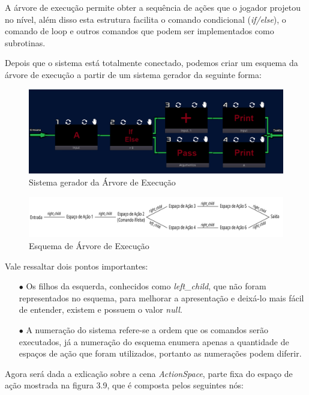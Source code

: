 A árvore de execução permite obter a sequência de ações que o jogador projetou
no nível, além disso esta estrutura facilita o comando condicional 
(\textit{if/else}), o comando de loop e outros comandos que podem ser 
implementados como subrotinas.

Depois que o sistema está totalmente conectado, podemos criar um esquema da
árvore de execução a partir de um sistema gerador da seguinte forma:

\begin{figure}[H]
    \includegraphics[width=\textwidth]{../figuras/sistema_conectado_arvore_execucao.png}
    \caption{Sistema gerador da Árvore de Execução}
\end{figure}

\begin{figure}[H]
    \includegraphics[width=\textwidth]{../figuras/arvore_execucao_redim.png}
    \caption{Esquema de Árvore de Execução}
\end{figure}

Vale ressaltar dois pontos importantes:

\begin{itemize}
    \item[$\bullet$]
        Os filhos da esquerda, conhecidos como \textit{left\_child}, que 
        não foram representados no esquema, para melhorar a apresentação e 
        deixá-lo mais fácil de entender, existem e possuem o valor 
        \textit{null}.
    \item[$\bullet$]
        A numeração do sistema refere-se a ordem que os comandos serão 
        executados, já a numeração do esquema enumera apenas a quantidade
        de espaços de ação que foram utilizados, portanto as numerações
        podem diferir.
\end{itemize} 

Agora será dada a exlicação sobre a cena \textit{ActionSpace}, parte fixa do 
espaço de ação mostrada na figura 3.9, que é composta pelos seguintes nós:


